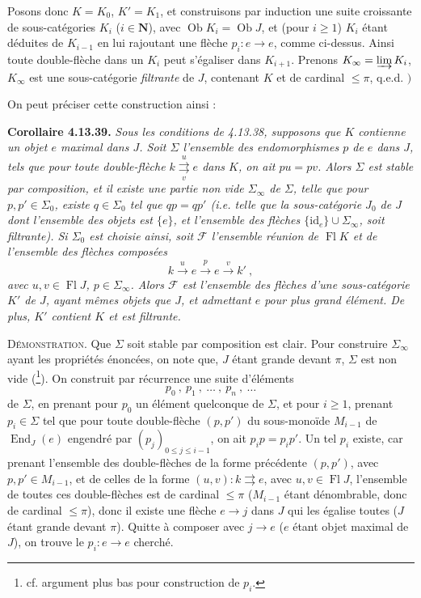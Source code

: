 \documentclass[11pt]{article}
\newcommand{\printedpage}[1]{\marginpar{\footnotesize p.~#1}}
\newcommand{\msp}[1]{\marginpar{\footnotesize [#1]}}
\newcommand{\Ob}{\operatorname{Ob}}
\newcommand{\Fl}{\operatorname{Fl}}
\newcommand{\id}{\mathrm{id}}
\newcommand{\limind}{\varinjlim}
\newcommand{\End}{\operatorname{End}}
\begin{document}
Posons donc $K = K_0$, $K' = K_1$, et construisons par induction une suite croissante de sous-catégories $K_i$ ($i \in \mathbf{N}$), avec $\Ob K_i = \Ob J$, et (pour $i \geqslant 1$) $K_i$ étant déduites de $K_{i-1}$ en lui rajoutant une flèche $p_i : e \longrightarrow e$, comme ci-dessus. Ainsi toute double-flèche dans un $K_i$ peut s'égaliser dans $K_{i+1}$. Prenons $K_\infty = \limind K_i$, $K_\infty$ est une sous-catégorie \textit{filtrante} de $J$, contenant $K$ et de cardinal $\leqslant \pi$, q.e.d. $\Biggr)$

On peut préciser cette construction ainsi :

\printedpage{139}

\noindent\textbf{Corollaire 4.13.39.} {\itshape Sous les conditions de 4.13.38, supposons que $K$ contienne un objet $e$ maximal dans $J$. Soit $\Sigma$ l'ensemble des endomorphismes $p$ de $e$ dans $J$, tels que pour toute double-flèche $k \overset{u}{\underset{v}{\rightrightarrows}} e$ \textup{dans} $K$, on ait $pu=pv$. Alors $\Sigma$ est stable par composition, et il existe une partie non vide $\Sigma_\infty$ de $\Sigma$, telle que pour $p,p'\in\Sigma_0$, existe
\msp{page 367}
$q\in\Sigma_0$ tel que $qp=qp'$ (i.e. telle que la sous-catégorie $J_0$ de $J$ dont l'ensemble des objets est $\{e\}$, et l'ensemble des flèches $\{\id_e\}\cup\Sigma_\infty$, soit filtrante). Si $\Sigma_0$ est choisie ainsi, soit $\mathcal{F}$ l'ensemble réunion de $\Fl K$ et de l'ensemble des flèches composées
\[
k \xrightarrow{\ u\ } e \xrightarrow{\ p\ } e \xrightarrow{\ v\ } k'\ , \tag*{$(*)$}
\]
avec $u,v\in\Fl J$, $p\in\Sigma_\infty$. Alors $\mathcal{F}$ est l'ensemble des flèches d'une sous-catégorie $K'$ de $J$, ayant mêmes objets que $J$, et admettant $e$ pour plus grand élément. De plus, $K'$ contient $K$ et est filtrante.}

\noindent\textsc{Démonstration}. Que $\Sigma$ soit stable par composition est clair. Pour construire $\Sigma_\infty$ ayant les propriétés énoncées, on note que, $J$ étant grande devant $\pi$, $\Sigma$ est non vide (\footnote[162]{cf. argument plus bas pour construction de $p_i$.}). On construit par récurrence une suite d'éléments
\[
p_0\ ,\ p_1\ ,\ \ldots\ ,\ p_n\ ,\ \ldots
\]
de $\Sigma$, en prenant pour $p_0$ un élément quelconque de $\Sigma$, et pour $i\geqslant 1$, prenant $p_i\in\Sigma$ tel que pour toute double-flèche $(p,p')$ du sous-monoïde $M_{i-1}$ de $\End_J(e)$ engendré par $(p_j)_{0\leqslant j\leqslant i-1}$, on ait $p_ip=p_ip'$. Un tel $p_i$ existe, car prenant l'ensemble des double-flèches de la forme précédente $(p,p')$, avec $p,p'\in M_{i-1}$, et de celles de la forme $(u,v) : k \rightrightarrows e$, avec $u,v\in\Fl J$, l'ensemble de
\msp{page 368}
toutes ces double-flèches est de cardinal $\leqslant\pi$ ($M_{i-1}$ étant dénombrable, donc de cardinal $\leqslant\pi$), donc il existe une flèche $e\longrightarrow j$ dans $J$ qui les égalise toutes ($J$ étant grande devant $\pi$). Quitte à composer avec $j\longrightarrow e$ ($e$ étant objet maximal de $J$), on trouve le $p_i : e\longrightarrow e$ cherché.
\end{document}

